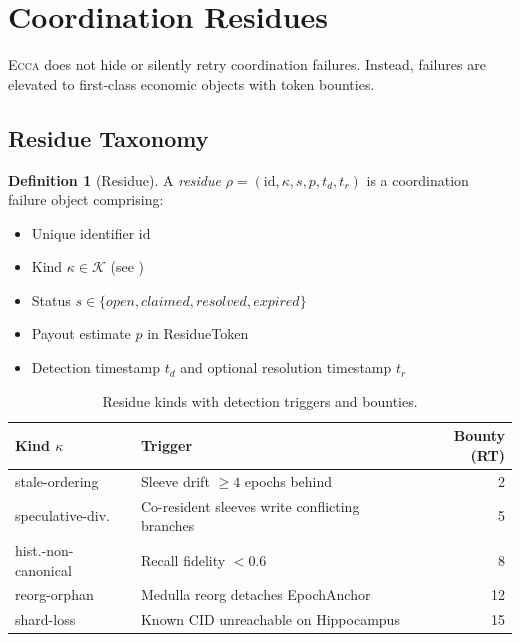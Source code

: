\documentclass[11pt,twocolumn]{article}
\theoremstyle{definition}
\newtheorem{definition}{Definition}[section]
\theoremstyle{plain}
\theoremstyle{remark}
\newcommand{\ecca}{\textsc{Ecca}}
\begin{document}
\section{Coordination Residues}\label{sec:residues}

\ecca{} does not hide or silently retry coordination failures. Instead, failures are elevated to first-class economic objects with token bounties.

\subsection{Residue Taxonomy}

\begin{definition}[Residue]\label{def:residue}
A \emph{residue} $\rho = (\mathrm{id}, \kappa, s, p, t_d, t_r)$ is a coordination failure object comprising:
\begin{itemize}[leftmargin=*,itemsep=1pt]
  \item Unique identifier $\mathrm{id}$
  \item Kind $\kappa \in \mathcal{K}$ (see )
  \item Status $s \in \{\textit{open}, \textit{claimed}, \textit{resolved}, \textit{expired}\}$
  \item Payout estimate $p$ in ResidueToken
  \item Detection timestamp $t_d$ and optional resolution timestamp $t_r$
\end{itemize}
\end{definition}

\begin{table}[t]
\centering
\caption{Residue kinds with detection triggers and bounties.}
\label{tab:residues}
\small
\begin{tabular}{@{}lp{3cm}r@{}}
\toprule
\textbf{Kind $\kappa$} & \textbf{Trigger} & \textbf{Bounty (RT)}\\
\midrule
stale-ordering & Sleeve drift $\geq 4$ epochs behind & 2\\
speculative-div. & Co-resident sleeves write conflicting branches & 5\\
hist.-non-canonical & Recall fidelity $< 0.6$ & 8\\
reorg-orphan & Medulla reorg detaches EpochAnchor & 12\\
shard-loss & Known CID unreachable on Hippocampus & 15\\
\bottomrule
\end{tabular}
\end{table}
\end{document}
